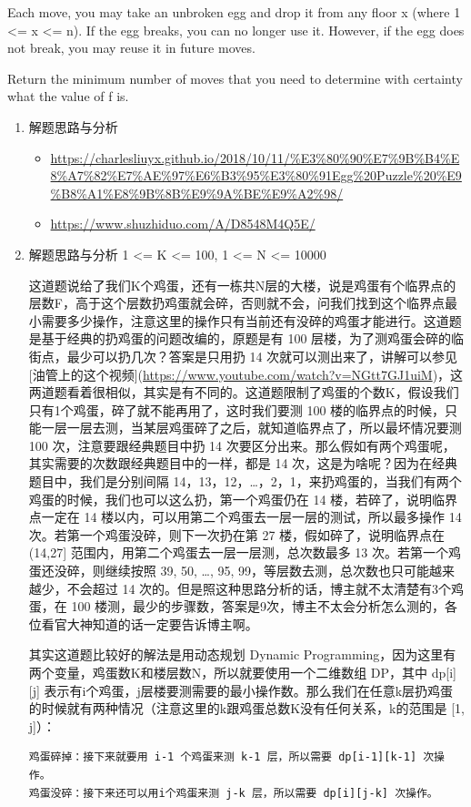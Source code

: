 \documentclass[9pt, b5paaper]{book}
\begin{document}
Each move, you may take an unbroken egg and drop it from any floor x (where 1 <= x <= n). If the egg breaks, you can no longer use it. However, if the egg does not break, you may reuse it in future moves.

Return the minimum number of moves that you need to determine with certainty what the value of f is.
\begin{enumerate}
\item 解题思路与分析
\label{sec-1-4-49-1}
\begin{itemize}
\item \url{https://charlesliuyx.github.io/2018/10/11/\%E3\%80\%90\%E7\%9B\%B4\%E8\%A7\%82\%E7\%AE\%97\%E6\%B3\%95\%E3\%80\%91Egg\%20Puzzle\%20\%E9\%B8\%A1\%E8\%9B\%8B\%E9\%9A\%BE\%E9\%A2\%98/}
\item \url{https://www.shuzhiduo.com/A/D8548M4Q5E/}
\end{itemize}
\item 解题思路与分析
\label{sec-1-4-49-2}
1 <= K <= 100, 
1 <= N <= 10000

这道题说给了我们K个鸡蛋，还有一栋共N层的大楼，说是鸡蛋有个临界点的层数F，高于这个层数扔鸡蛋就会碎，否则就不会，问我们找到这个临界点最小需要多少操作，注意这里的操作只有当前还有没碎的鸡蛋才能进行。这道题是基于经典的扔鸡蛋的问题改编的，原题是有 100 层楼，为了测鸡蛋会碎的临街点，最少可以扔几次？答案是只用扔 14 次就可以测出来了，讲解可以参见[油管上的这个视频](\url{https://www.youtube.com/watch?v=NGtt7GJ1uiM})，这两道题看着很相似，其实是有不同的。这道题限制了鸡蛋的个数K，假设我们只有1个鸡蛋，碎了就不能再用了，这时我们要测 100 楼的临界点的时候，只能一层一层去测，当某层鸡蛋碎了之后，就知道临界点了，所以最坏情况要测 100 次，注意要跟经典题目中扔 14 次要区分出来。那么假如有两个鸡蛋呢，其实需要的次数跟经典题目中的一样，都是 14 次，这是为啥呢？因为在经典题目中，我们是分别间隔 14，13，12，\ldots{}，2，1，来扔鸡蛋的，当我们有两个鸡蛋的时候，我们也可以这么扔，第一个鸡蛋仍在 14 楼，若碎了，说明临界点一定在 14 楼以内，可以用第二个鸡蛋去一层一层的测试，所以最多操作 14 次。若第一个鸡蛋没碎，则下一次扔在第 27 楼，假如碎了，说明临界点在 (14,27] 范围内，用第二个鸡蛋去一层一层测，总次数最多 13 次。若第一个鸡蛋还没碎，则继续按照 39, 50, \ldots{}, 95, 99，等层数去测，总次数也只可能越来越少，不会超过 14 次的。但是照这种思路分析的话，博主就不太清楚有3个鸡蛋，在 100 楼测，最少的步骤数，答案是9次，博主不太会分析怎么测的，各位看官大神知道的话一定要告诉博主啊。

其实这道题比较好的解法是用动态规划 Dynamic Programming，因为这里有两个变量，鸡蛋数K和楼层数N，所以就要使用一个二维数组 DP，其中 dp[i][j] 表示有i个鸡蛋，j层楼要测需要的最小操作数。那么我们在任意k层扔鸡蛋的时候就有两种情况（注意这里的k跟鸡蛋总数K没有任何关系，k的范围是 [1, j]）：
\begin{verbatim}
鸡蛋碎掉：接下来就要用 i-1 个鸡蛋来测 k-1 层，所以需要 dp[i-1][k-1] 次操作。
鸡蛋没碎：接下来还可以用i个鸡蛋来测 j-k 层，所以需要 dp[i][j-k] 次操作。
\end{verbatim}


\end{enumerate}
\end{document}
